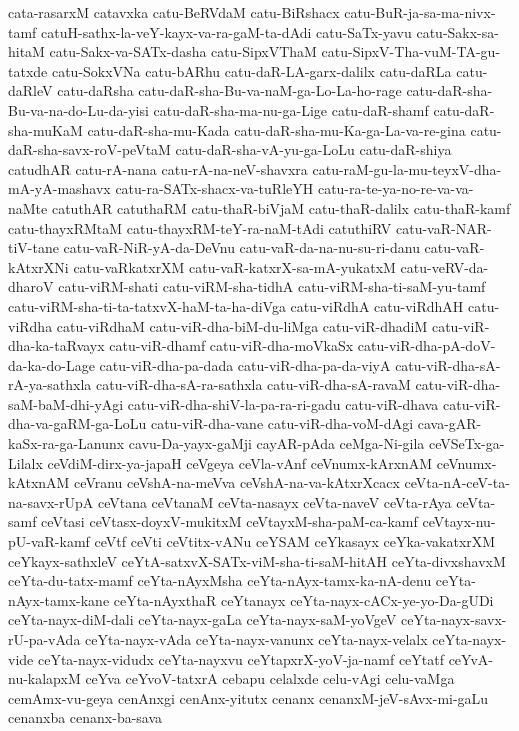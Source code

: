 {cata-rasarxM
catavxka
catu-BeRVdaM
catu-BiRshacx
catu-BuR-ja-sa-ma-nivx-tamf
catuH-sathx-la-veY-kayx-va-ra-gaM-ta-dAdi
catu-SaTx-yavu
catu-Sakx-sa-hitaM
catu-Sakx-va-SATx-dasha
catu-SipxVThaM
catu-SipxV-Tha-vuM-TA-gu-tatxde
catu-SokxVNa
catu-bARhu
catu-daR-LA-garx-dalilx
catu-daRLa
catu-daRleV
catu-daRsha
catu-daR-sha-Bu-va-naM-ga-Lo-La-ho-rage
catu-daR-sha-Bu-va-na-do-Lu-da-yisi
catu-daR-sha-ma-nu-ga-Lige
catu-daR-shamf
catu-daR-sha-muKaM
catu-daR-sha-mu-Kada
catu-daR-sha-mu-Ka-ga-La-va-re-gina
catu-daR-sha-savx-roV-peVtaM
catu-daR-sha-vA-yu-ga-LoLu
catu-daR-shiya
catudhAR
catu-rA-nana
catu-rA-na-neV-shavxra
catu-raM-gu-la-mu-teyxV-dha-mA-yA-mashavx
catu-ra-SATx-shacx-va-tuRleYH
catu-ra-te-ya-no-re-va-va-naMte
catuthAR
catuthaRM
catu-thaR-biVjaM
catu-thaR-dalilx
catu-thaR-kamf
catu-thayxRMtaM
catu-thayxRM-teY-ra-naM-tAdi
catuthiRV
catu-vaR-NAR-tiV-tane
catu-vaR-NiR-yA-da-DeVnu
catu-vaR-da-na-nu-su-ri-danu
catu-vaR-kAtxrXNi
catu-vaRkatxrXM
catu-vaR-katxrX-sa-mA-yukatxM
catu-veRV-da-dharoV
catu-viRM-shati
catu-viRM-sha-tidhA
catu-viRM-sha-ti-saM-yu-tamf
catu-viRM-sha-ti-ta-tatxvX-haM-ta-ha-diVga
catu-viRdhA
catu-viRdhAH
catu-viRdha
catu-viRdhaM
catu-viR-dha-biM-du-liMga
catu-viR-dhadiM
catu-viR-dha-ka-taRvayx
catu-viR-dhamf
catu-viR-dha-moVkaSx
catu-viR-dha-pA-doV-da-ka-do-Lage
catu-viR-dha-pa-dada
catu-viR-dha-pa-da-viyA
catu-viR-dha-sA-rA-ya-sathxla
catu-viR-dha-sA-ra-sathxla
catu-viR-dha-sA-ravaM
catu-viR-dha-saM-baM-dhi-yAgi
catu-viR-dha-shiV-la-pa-ra-ri-gadu
catu-viR-dhava
catu-viR-dha-va-gaRM-ga-LoLu
catu-viR-dha-vane
catu-viR-dha-voM-dAgi
cava-gAR-kaSx-ra-ga-Lanunx
cavu-Da-yayx-gaMji
cayAR-pAda
ceMga-Ni-gila
ceVSeTx-ga-Lilalx
ceVdiM-dirx-ya-japaH
ceVgeya
ceVla-vAnf
ceVnumx-kArxnAM
ceVnumx-kAtxnAM
ceVranu
ceVshA-na-meVva
ceVshA-na-va-kAtxrXcacx
ceVta-nA-ceV-ta-na-savx-rUpA
ceVtana
ceVtanaM
ceVta-nasayx
ceVta-naveV
ceVta-rAya
ceVta-samf
ceVtasi
ceVtasx-doyxV-mukitxM
ceVtayxM-sha-paM-ca-kamf
ceVtayx-nu-pU-vaR-kamf
ceVtf
ceVti
ceVtitx-vANu
ceYSAM
ceYkasayx
ceYka-vakatxrXM
ceYkayx-sathxleV
ceYtA-satxvX-SATx-viM-sha-ti-saM-hitAH
ceYta-divxshavxM
ceYta-du-tatx-mamf
ceYta-nAyxMsha
ceYta-nAyx-tamx-ka-nA-denu
ceYta-nAyx-tamx-kane
ceYta-nAyxthaR
ceYtanayx
ceYta-nayx-cACx-ye-yo-Da-gUDi
ceYta-nayx-diM-dali
ceYta-nayx-gaLa
ceYta-nayx-saM-yoVgeV
ceYta-nayx-savx-rU-pa-vAda
ceYta-nayx-vAda
ceYta-nayx-vanunx
ceYta-nayx-velalx
ceYta-nayx-vide
ceYta-nayx-vidudx
ceYta-nayxvu
ceYtapxrX-yoV-ja-namf
ceYtatf
ceYvA-nu-kalapxM
ceYva
ceYvoV-tatxrA
cebapu
celalxde
celu-vAgi
celu-vaMga
cemAmx-vu-geya
cenAnxgi
cenAnx-yitutx
cenanx
cenanxM-jeV-sAvx-mi-gaLu
cenanxba
cenanx-ba-sava
}

